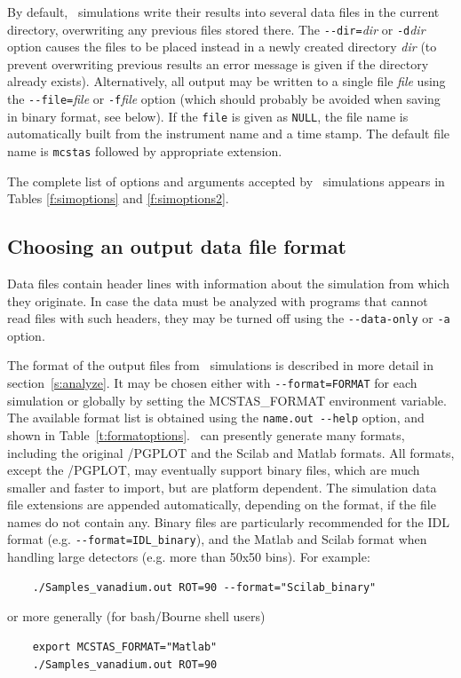 By default, \MCS\ simulations write their results into several data files in the
current directory, overwriting any previous files stored there. The
\verb+--dir=+\textit{dir} or \verb+-d+\textit{dir} option causes the files to be
placed instead in a newly created directory \textit{dir} (to prevent overwriting
previous results an error message is given if the directory already exists).
Alternatively, all output may be written to a single file \textit{file} using
the \verb+--file=+\textit{file} or \verb+-f+\textit{file} option (which should
probably be avoided when saving in binary format, see below). If the \verb+file+
is given as \verb+NULL+, the file name is automatically built from the
instrument name and a time stamp. The default file name is \verb+mcstas+
followed by appropriate extension.

The complete list of options
and arguments accepted by \MCS\ simulations appears in
Tables \ref{f:simoptions} and \ref{f:simoptions2}.

\subsection{Choosing an output data file format}

Data files contain header lines with information about the simulation from which
they originate. In case the data must be analyzed with programs that cannot read
files with such headers, they may be turned off using the \verb+--data-only+ or
\verb+-a+ option.  

The format of the output files from \MCS\ simulations is described in more
detail in section~\ref{s:analyze}. It may be chosen either with
\verb+--format=FORMAT+ for each simulation or globally by setting the
MCSTAS\_FORMAT environment variable. 
The available format list is obtained using the \verb+name.out --help+ option,
and shown in Table~\ref{t:formatoptions}. 
  
  \MCS\ can presently generate many
formats, including the original \MCS /PGPLOT and the Scilab and Matlab
formats. All formats, except the \MCS /PGPLOT, may eventually support binary
files, which are much smaller and faster to import, but are platform
dependent. The simulation data file extensions are appended automatically,
depending on the format, if the file names do not contain any. Binary files are
particularly recommended for the IDL format (e.g. \verb+--format=IDL_binary+),
and the Matlab and Scilab format when handling large detectors (e.g. more than
50x50 bins). For example:
\begin{verbatim}
    ./Samples_vanadium.out ROT=90 --format="Scilab_binary"
\end{verbatim}
or more generally (for bash/Bourne shell users)
\begin{verbatim}
    export MCSTAS_FORMAT="Matlab"
    ./Samples_vanadium.out ROT=90
\end{verbatim}


